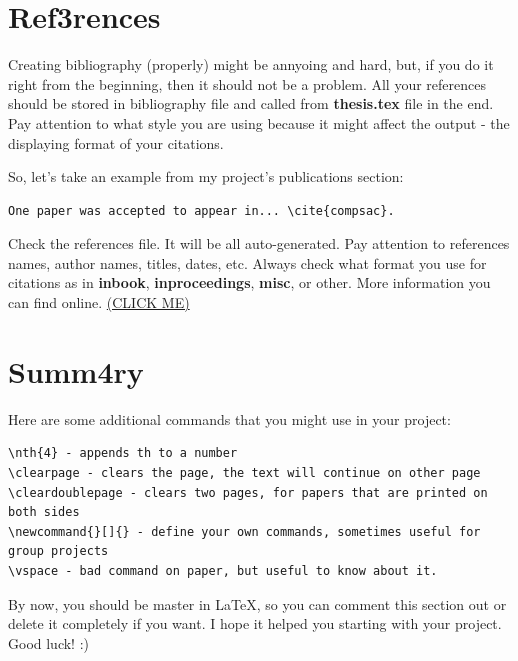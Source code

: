 \section{Ref3rences}
Creating bibliography (properly) might be annyoing and hard, but, if you do it right from the beginning, then it should not be a problem. All your references should be stored in bibliography file and called from \textbf{thesis.tex} file in the end. Pay attention to what style you are using because it might affect the output - the displaying format of your citations.

So, let's take an example from my project's publications section:

\begin{verbatim}
One paper was accepted to appear in... \cite{compsac}.
\end{verbatim}



Check the references file. It will be all auto-generated. Pay attention to references names, author names, titles, dates, etc. Always check what format you use for citations as in \textbf{inbook}, \textbf{inproceedings}, \textbf{misc}, or other. More information you can find online. \href{https://www.overleaf.com/learn/latex/bibliography_management_with_bibtex}{(CLICK ME)}


\section{Summ4ry}
Here are some additional commands that you might use in your project:

\begin{verbatim}
\nth{4} - appends th to a number
\clearpage - clears the page, the text will continue on other page
\cleardoublepage - clears two pages, for papers that are printed on both sides
\newcommand{}[]{} - define your own commands, sometimes useful for group projects
\vspace - bad command on paper, but useful to know about it.
\end{verbatim}

By now, you should be master in \LaTeX, so you can comment this section out or delete it completely if you want. I hope it helped you starting with your project. Good luck! :)


